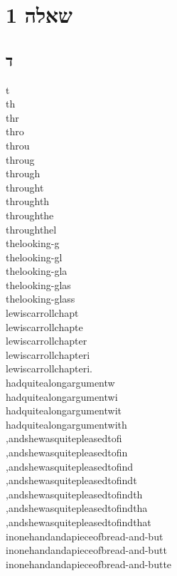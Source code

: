 \documentclass{article}
\begin{document}


\section*{שאלה 1}

\subsection*{ד}
t\\
th\\
thr\\
thro\\
throu\\
throug\\
through\\
throught\\
throughth\\
throughthe\\
throughthel\\
thelooking-g\\
thelooking-gl\\
thelooking-gla\\
thelooking-glas\\
thelooking-glass\\
lewiscarrollchapt\\
lewiscarrollchapte\\
lewiscarrollchapter\\
lewiscarrollchapteri\\
lewiscarrollchapteri.\\
hadquitealongargumentw\\
hadquitealongargumentwi\\
hadquitealongargumentwit\\
hadquitealongargumentwith\\
,andshewasquitepleasedtofi\\
,andshewasquitepleasedtofin\\
,andshewasquitepleasedtofind\\
,andshewasquitepleasedtofindt\\
,andshewasquitepleasedtofindth\\
,andshewasquitepleasedtofindtha\\
,andshewasquitepleasedtofindthat\\
inonehandandapieceofbread-and-but\\
inonehandandapieceofbread-and-butt\\
inonehandandapieceofbread-and-butte\\
\end{document}
